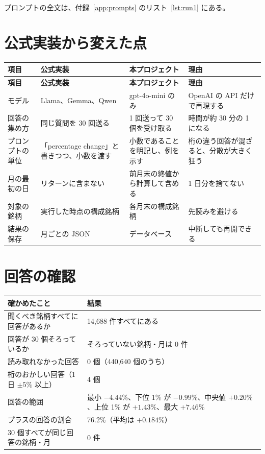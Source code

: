 \documentclass[xelatex,ja=standard,jafont=hiragino-pron,a4paper,10pt]{bxjsreport}
\begin{document}
プロンプトの全文は、付録~\ref{app:prompts} のリスト~\ref{lst:run1} にある。

\section{公式実装から変えた点}

\begin{longtable}{p{3.20cm}p{4.40cm}p{4.20cm}p{2.60cm}}
\toprule
\textbf{項目} & \textbf{公式実装} & \textbf{本プロジェクト} & \textbf{理由} \\
\midrule
\endfirsthead
\toprule
\textbf{項目} & \textbf{公式実装} & \textbf{本プロジェクト} & \textbf{理由} \\
\midrule
\endhead
\bottomrule
\endfoot
モデル & Llama、Gemma、Qwen & gpt-4o-mini のみ & OpenAI の API だけで再現する \\
回答の集め方 & 同じ質問を 30 回送る & 1 回送って 30 個を受け取る & 時間が約 30 分の 1 になる \\
プロンプトの単位 & 「percentage change」と書きつつ、小数を渡す & 小数であることを明記し、例を示す & 桁の違う回答が混ざると、分散が大きく狂う \\
月の最初の日 & リターンに含まない & 前月末の終値から計算して含める & 1 日分を捨てない \\
対象の銘柄 & 実行した時点の構成銘柄 & 各月末の構成銘柄 & 先読みを避ける \\
結果の保存 & 月ごとの JSON & データベース & 中断しても再開できる \\
\end{longtable}

\section{回答の確認}

\begin{longtable}{p{6.40cm}p{8.00cm}}
\toprule
\textbf{確かめたこと} & \textbf{結果} \\
\midrule
\endfirsthead
\bottomrule
\endfoot
聞くべき銘柄すべてに回答があるか & 14,688 件すべてにある \\
回答が 30 個そろっているか & そろっていない銘柄・月は 0 件 \\
読み取れなかった回答 & 0 個（440,640 個のうち） \\
桁のおかしい回答（1 日 $\pm 5\%$ 以上） & 4 個 \\
回答の範囲 & 最小 $-4.44\%$、下位 1\% が $-0.99\%$、中央値 $+0.20\%$、上位 1\% が $+1.43\%$、最大 $+7.46\%$ \\
プラスの回答の割合 & 76.2\%（平均は $+0.184\%$） \\
30 個すべてが同じ回答の銘柄・月 & 0 件 \\
\end{longtable}
\end{document}
